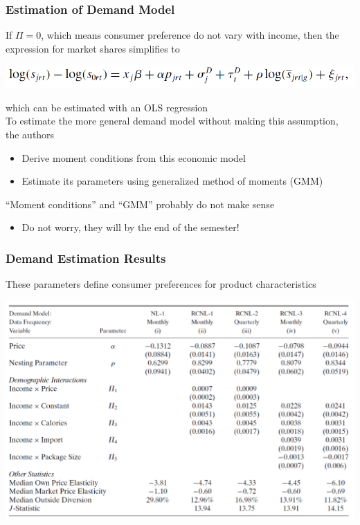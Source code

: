 \documentclass{beamer}
\begin{document}
\begin{frame}\frametitle{Estimation of Demand Model}
    If $\Pi = 0$, which means consumer preference do not vary with income, then the expression for market shares simplifies to
    \begin{center}
        \includegraphics[width=0.8\linewidth]{eq_7}
    \end{center}
    which can be estimated with an OLS regression \\
    \vspace{2ex}
    To estimate the more general demand model without making this assumption, the authors 
    \begin{itemize}
        \item Derive moment conditions from this economic model
        \item Estimate its parameters using generalized method of moments (GMM)
    \end{itemize}
    \vspace{2ex}
    ``Moment conditions'' and ``GMM'' probably do not make sense
    \begin{itemize}
        \item Do not worry, they will by the end of the semester!
    \end{itemize}
\end{frame}

\begin{frame}\frametitle{Demand Estimation Results}
    These parameters define consumer preferences for product characteristics \\
    \begin{center}
        \includegraphics[width=0.9\linewidth]{table_4}
    \end{center}
\end{frame}
\end{document}
